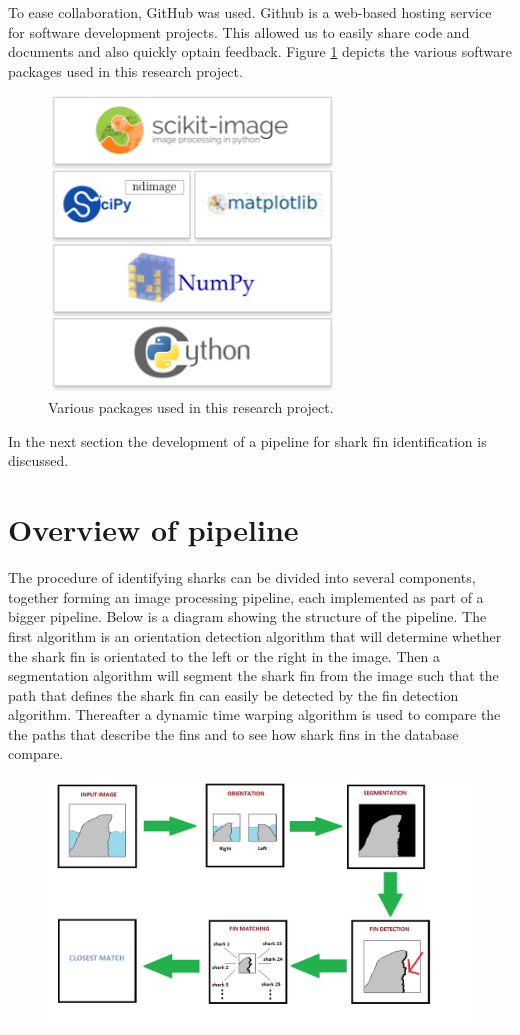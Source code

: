 \documentclass[a4paper,10pt]{article}
\begin{document}
To ease collaboration, GitHub was used.  Github is a web-based hosting service
for software development projects.  This allowed us to easily
share code and documents and also quickly optain feedback.
Figure \ref{packages} depicts the various software packages used in this research project.

\begin{figure}[H]
 \centering
 \includegraphics[width=3in]{logos.jpg}
 \caption{Various packages used in this research project.}
 \label{packages}
\end{figure}

In the next section the development of a pipeline for shark fin identification is discussed.

\newpage
\section{Overview of pipeline}
The procedure of identifying sharks can be
  divided into several components, together forming an image processing pipeline, each implemented as part of
  a bigger pipeline.  Below is a diagram showing the structure of the pipeline.  The first algorithm is an orientation detection
algorithm that will determine whether the shark fin is orientated to the left or the right in the image.
Then a segmentation algorithm will segment the shark fin from the image such that the path that defines the shark fin 
can easily be detected by the fin detection algorithm.  Thereafter a dynamic time warping algorithm is used
to compare the the paths that describe the fins and to see how shark fins in the database compare.

\begin{figure}[H]
 \centering
 \includegraphics[width=5in]{pipeline.png}
\end{figure}
\end{document}
